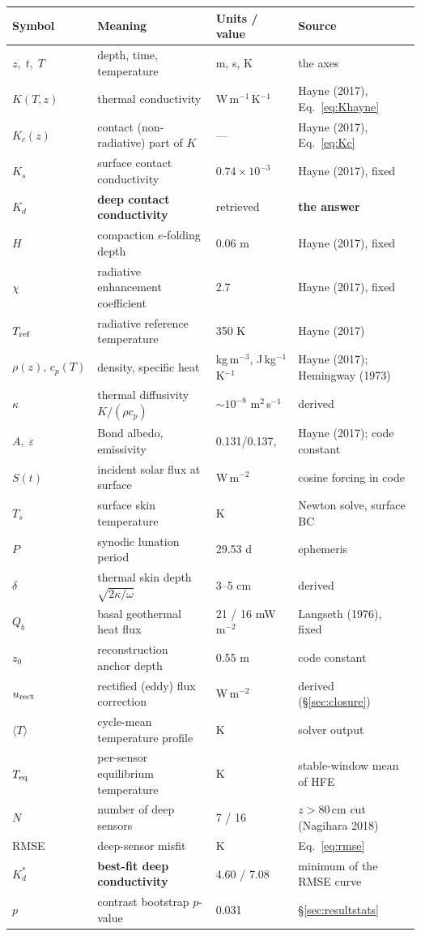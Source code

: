 \documentclass[11pt]{report}
\newcommand{\Tm}{\langle T\rangle}
\begin{document}
\begin{center}\footnotesize
\begin{tabular}{@{}p{1.7cm}p{5.4cm}p{3.0cm}p{4.8cm}@{}}
\toprule
Symbol & Meaning & Units / value & Source \\
\midrule
$z,\;t,\;T$ & depth, time, temperature & m, s, K & the axes \\
$K(T,z)$ & thermal conductivity & W\,m$^{-1}$\,K$^{-1}$ & Hayne (2017), Eq.~\eqref{eq:Khayne} \\
$K_c(z)$ & contact (non-radiative) part of $K$ & --- & Hayne (2017), Eq.~\eqref{eq:Kc} \\
$K_s$ & surface contact conductivity & $0.74\times10^{-3}$ & Hayne (2017), fixed \\
$\boxed{K_d}$ & \textbf{deep contact conductivity} & retrieved & \textbf{the answer} \\
$H$ & compaction $e$-folding depth & 0.06 m & Hayne (2017), fixed \\
$\chi$ & radiative enhancement coefficient & 2.7 & Hayne (2017), fixed \\
$T_{\rm ref}$ & radiative reference temperature & 350 K & Hayne (2017) \\
$\rho(z),\,c_p(T)$ & density, specific heat & kg\,m$^{-3}$, J\,kg$^{-1}$K$^{-1}$ & Hayne (2017); Hemingway (1973) \\
$\kappa$ & thermal diffusivity $K/(\rho c_p)$ & $\sim10^{-8}$ m$^2$\,s$^{-1}$ & derived \\
$A,\;\varepsilon$ & Bond albedo, emissivity & 0.131/0.137,\; 0.95 & Hayne (2017); code constant \\
$S(t)$ & incident solar flux at surface & W\,m$^{-2}$ & cosine forcing in code \\
$T_s$ & surface skin temperature & K & Newton solve, surface BC \\
$P$ & synodic lunation period & 29.53 d & ephemeris \\
$\delta$ & thermal skin depth $\sqrt{2\kappa/\omega}$ & 3--5 cm & derived \\
$Q_b$ & basal geothermal heat flux & 21 / 16 mW\,m$^{-2}$ & Langseth (1976), fixed \\
$z_0$ & reconstruction anchor depth & 0.55 m & code constant \\
$u_{\rm rect}$ & rectified (eddy) flux correction & W\,m$^{-2}$ & derived (\S\ref{sec:closure}) \\
$\Tm$ & cycle-mean temperature profile & K & solver output \\
$T_{\rm eq}$ & per-sensor equilibrium temperature & K & stable-window mean of HFE \\
$N$ & number of deep sensors & 7 / 16 & $z>80$\,cm cut (Nagihara 2018) \\
RMSE & deep-sensor misfit & K & Eq.~\eqref{eq:rmse} \\
$\boxed{K_d^*}$ & \textbf{best-fit deep conductivity} & 4.60 / 7.08 & minimum of the RMSE curve \\
$p$ & contrast bootstrap $p$-value & 0.031 & \S\ref{sec:resultstats} \\
\bottomrule
\end{tabular}
\end{center}
\end{document}
